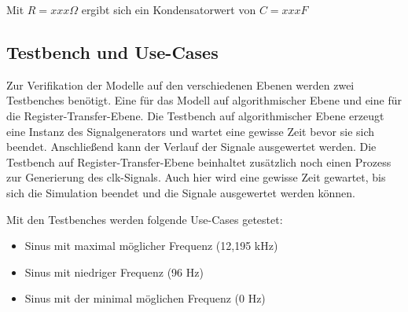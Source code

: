 Mit $R=xxx \Omega$ ergibt sich ein Kondensatorwert von $C=xxx F$

\subsection{Testbench und Use-Cases}
Zur Verifikation der Modelle auf den verschiedenen Ebenen werden zwei Testbenches 
benötigt. Eine für das Modell auf algorithmischer Ebene und eine für die Register-Transfer-Ebene.
Die Testbench auf algorithmischer Ebene erzeugt eine Instanz des Signalgenerators und
wartet eine gewisse Zeit bevor sie sich beendet. Anschließend kann der Verlauf der
Signale ausgewertet werden.
Die Testbench auf Register-Transfer-Ebene beinhaltet zusätzlich noch einen Prozess
zur Generierung des clk-Signals. Auch hier wird eine gewisse Zeit gewartet, bis sich die
Simulation beendet und die Signale ausgewertet werden können.

\noindent Mit den Testbenches werden folgende Use-Cases getestet:
\begin{itemize}
    \item Sinus mit maximal möglicher Frequenz (12,195 kHz)
    \item Sinus mit niedriger Frequenz (96 Hz)
    \item Sinus mit der minimal möglichen Frequenz (0 Hz)
\end{itemize}